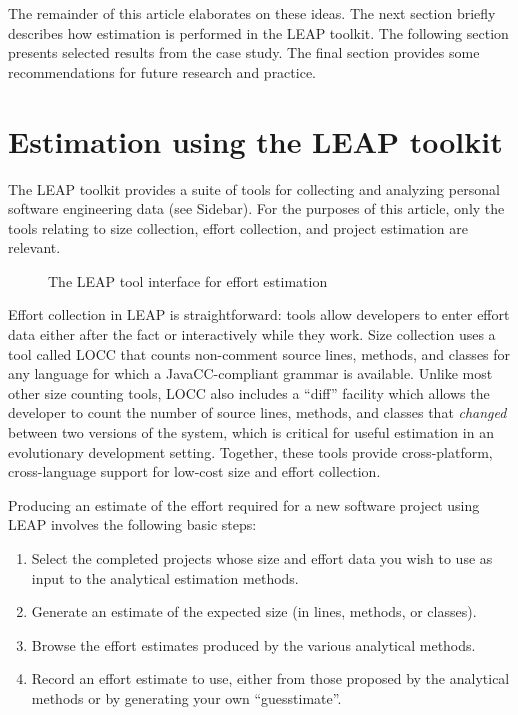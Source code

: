 The remainder of this article elaborates on these ideas. The next section
briefly describes how estimation is performed in the LEAP toolkit.  The
following section presents selected results from the case study. The final
section provides some recommendations for future research and practice.

\section{Estimation using the LEAP toolkit}

The LEAP toolkit provides a suite of tools for collecting and analyzing 
personal software engineering data (see Sidebar).  For the purposes of
this article, only the tools relating to size collection, effort collection,
and project estimation are relevant. 

\begin{figure*}[t]
  {\centerline{}}
  \caption{The LEAP tool interface for effort estimation}
  \label{fig:time-est}
\end{figure*}

Effort collection in LEAP is straightforward: tools allow developers to
enter effort data either after the fact or interactively while they
work. Size collection uses a tool called LOCC \cite{csdl-99-10} that 
counts non-comment source lines, methods, and classes for any language for
which a JavaCC-compliant grammar is available.  Unlike most other size
counting tools, LOCC also includes a ``diff'' facility which allows the
developer to count the number of source lines, methods, and classes that {\em changed}
between two versions of the system, which is critical for useful
estimation in an evolutionary development setting.  Together, these tools
provide cross-platform, cross-language support for low-cost size and effort
collection. 

Producing an estimate of the effort required for a new software project
using LEAP involves the following basic steps:
\begin{enumerate}
\item Select the completed projects whose size and effort data you wish to use as input 
to the analytical estimation methods.
\item Generate an estimate of the expected size (in lines, methods, or
classes).
\item Browse the effort estimates produced by the various analytical methods.
\item Record an effort estimate to use, either from those proposed by the
analytical methods or by generating your own ``guesstimate''. 
\end{enumerate}

